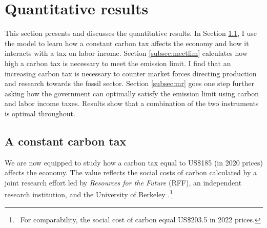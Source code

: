 \section{Quantitative results}\label{sec:res}

This section presents and discusses the quantitative results. 
In Section \ref{subsec:exp}, I use the model to learn how a constant carbon tax affects the economy and how it interacts with a tax on labor income. Section \ref{subsec:meetlim} calculates how high a carbon tax is necessary to meet the emission limit. I find that an increasing carbon tax is necessary to counter market forces directing production and research towards the fossil sector. 
Section \ref{subsec:mr} goes one step further asking  how the government can optimally satisfy the emission limit using carbon and labor income taxes. Results show that a combination of the two instruments is optimal throughout. 


\subsection{A constant carbon tax}\label{subsec:exp}


We are now equipped to study how a carbon tax  equal to US\$185 (in 2020 prices) affects the economy. The value reflects the social costs of carbon calculated by a joint research effort led by \textit{Resources for the Future} (RFF), an independent research institution, and the University of Berkeley \citep{Rennert2022ComprehensiveCO2}.\footnote{\  For comparability, the social cost of carbon equal US\$203.5 in 2022 prices.}


